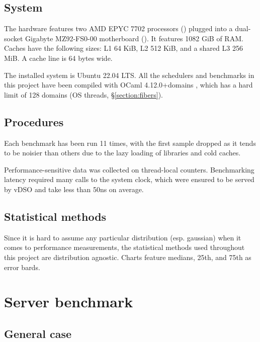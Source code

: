 \documentclass[12pt,a4paper,twoside]{report}
\begin{document}
\subsection{System}
\label{section:methods_system}
The hardware features two AMD EPYC 7702 processors (\cite{2ndGenAM8:online}) plugged into a dual-socket Gigabyte MZ92-FS0-00 motherboard (\cite{MD90FS0r76:online}). It features 1082 GiB of RAM. Caches have the following sizes: L1 64 KiB, L2 512 KiB, and a shared L3 256 MiB. A cache line is 64 bytes wide. 

The installed system is Ubuntu 22.04 LTS. All the schedulers and benchmarks in this project have been compiled with OCaml 4.12.0+domains \cite{ocamlmul16:online}, which has a hard limit of 128 domains (OS threads, \S\ref{section:fibers}). 

\subsection{Procedures}
Each benchmark has been run 11 times, with the first sample dropped as it tends to be noisier than others due to the lazy loading of libraries and cold caches. 

Performance-sensitive data was collected on thread-local counters. Benchmarking latency required many calls to the system clock, which were ensured to be served by vDSO \cite{vdso7Lin5:online} and take less than 50ns on average. 

\subsection{Statistical methods}
Since it is hard to assume any particular distribution (esp. gaussian) when it comes to performance measurements, the statistical methods used throughout this project are distribution agnostic. Charts feature medians, 25th, and 75th as error bards.


\section{Server benchmark} 
\label{section:server_benchmark}

\subsection{General case}
\label{section:benchmark-general-case}
\end{document}

